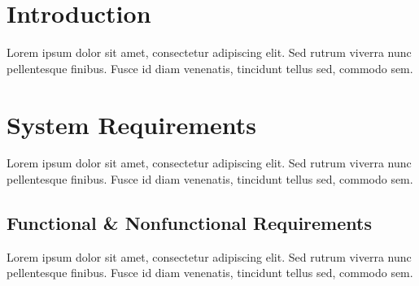 \newpage %

\renewcommand{\thesection}{\Roman{section}} %

\tableofcontents %

\newpage
\section{Introduction} %
Lorem ipsum dolor sit amet, consectetur adipiscing elit. Sed rutrum viverra nunc pellentesque finibus. Fusce id diam venenatis, tincidunt tellus sed, commodo sem.

\section{System Requirements}
Lorem ipsum dolor sit amet, consectetur adipiscing elit. Sed rutrum viverra nunc pellentesque finibus. Fusce id diam venenatis, tincidunt tellus sed, commodo sem.

\subsection*{Functional \& Nonfunctional Requirements} %
Lorem ipsum dolor sit amet, consectetur adipiscing elit. Sed rutrum viverra nunc pellentesque finibus. Fusce id diam venenatis, tincidunt tellus sed, commodo sem.

